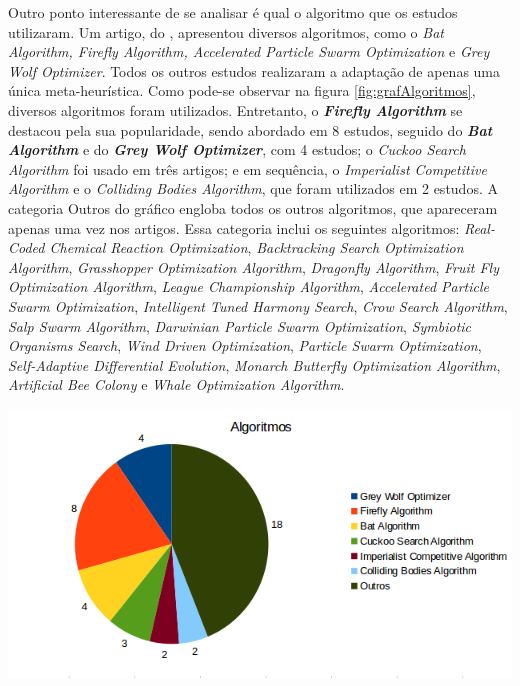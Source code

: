 Outro ponto interessante de se analisar é qual o algoritmo que os estudos utilizaram. Um artigo, do \cite{mitic2}, apresentou diversos algoritmos, como o \textit{Bat Algorithm, Firefly Algorithm, Accelerated Particle Swarm Optimization} e \textit{Grey Wolf Optimizer}. Todos os outros estudos realizaram a adaptação de apenas uma única meta-heurística. Como pode-se observar na figura \ref{fig:grafAlgoritmos}, diversos algoritmos foram utilizados. Entretanto, o\textbf{ \textit{Firefly Algorithm}} se destacou pela sua popularidade, sendo abordado em 8 estudos, seguido do \textbf{\textit{Bat Algorithm}} e do \textbf{\textit{Grey Wolf Optimizer}}, com 4 estudos; o \textit{Cuckoo Search Algorithm} foi usado em três artigos; e em sequência, o \textit{Imperialist Competitive Algorithm} e o \textit{Colliding Bodies Algorithm}, que foram utilizados em 2 estudos. A categoria Outros do gráfico engloba todos os outros algoritmos, que apareceram apenas uma vez nos artigos. Essa categoria inclui os seguintes algoritmos: \textit{Real-Coded Chemical Reaction Optimization}, \textit{Backtracking Search Optimization Algorithm}, \textit{Grasshopper Optimization Algorithm}, \textit{Dragonfly Algorithm}, \textit{Fruit Fly Optimization Algorithm}, \textit{League Championship Algorithm}, \textit{Accelerated Particle Swarm Optimization}, \textit{Intelligent Tuned Harmony Search}, \textit{Crow Search Algorithm}, \textit{Salp Swarm Algorithm}, \textit{Darwinian Particle Swarm Optimization}, \textit{Symbiotic Organisms Search}, \textit{Wind Driven Optimization}, \textit{Particle Swarm Optimization}, \textit{Self-Adaptive Differential Evolution}, \textit{Monarch Butterfly Optimization Algorithm}, \textit{Artificial Bee Colony} e \textit{Whale Optimization Algorithm}.

{
    \centering
    \includegraphics[width=0.9\linewidth]{figuras/graficoAlgoritmos2.png}
    \label{fig:grafAlgoritmos}
}


